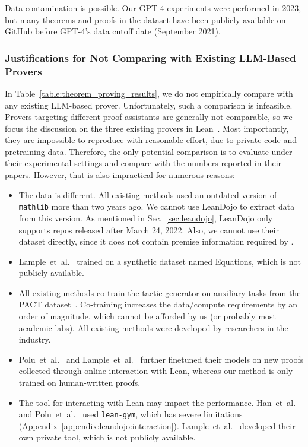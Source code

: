 Data contamination is possible. Our GPT-4 experiments were performed in 2023, but many theorems and proofs in the dataset have been publicly available on GitHub before GPT-4's data cutoff date (September 2021).


\subsubsection{Justifications for Not Comparing with Existing LLM-Based Provers}
\label{appendix:comparisons}

In Table~\ref{table:theorem_proving_results}, we do not empirically compare {\name} with any existing LLM-based prover. Unfortunately, such a comparison is infeasible. Provers targeting different proof assistants are generally not comparable, so we focus the discussion on the three existing provers in Lean~\cite{han2022proof,polu2023formal,lample2022hypertree}. Most importantly, they are impossible to reproduce with reasonable effort, due to private code and pretraining data. Therefore, the only potential comparison is to evaluate {\name} under their experimental settings and compare with the numbers reported in their papers. However, that is also impractical for numerous reasons:
\begin{itemize}

\item The data is different. All existing methods used an outdated version of \texttt{mathlib} more than two years ago. We cannot use LeanDojo to extract data from this version. As mentioned in Sec.~\ref{sec:leandojo},
LeanDojo only supports repos released after March 24, 2022. Also, we cannot use their dataset directly, since it does not contain premise information required by {\name}.

\item Lample~et~al.~\cite{lample2022hypertree} trained on a synthetic dataset named Equations, which is not publicly available.

\item All existing methods co-train the tactic generator on auxiliary tasks from the PACT dataset~\cite{han2022proof}. Co-training increases the data/compute requirements by an order of magnitude, which cannot be afforded by us (or probably most academic labs). All existing methods were developed by researchers in the industry.

\item Polu~et~al.~\cite{polu2023formal} and Lample~et~al.~\cite{lample2022hypertree} further finetuned their models on new proofs collected through online interaction with Lean, whereas our method is only trained on human-written proofs.

\item The tool for interacting with Lean may impact the performance. Han~et~al.~\cite{han2022proof} and Polu~et~al.~\cite{polu2023formal} used \texttt{lean-gym}, which has severe limitations (Appendix~\ref{appendix:leandojo:interaction}). Lample~et~al.~\cite{lample2022hypertree} developed their own private tool, which is not publicly available.

\end{itemize}


